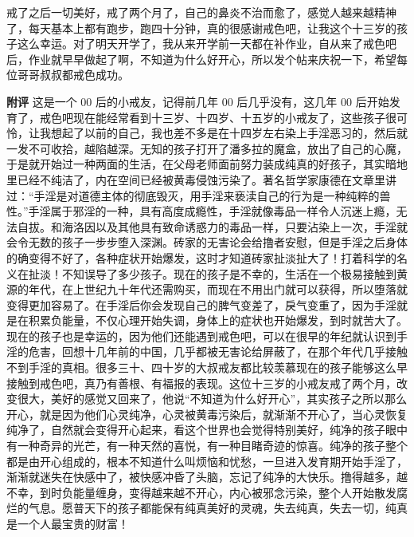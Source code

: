 \begin{case}
    戒了之后一切美好，戒了两个月了，自己的鼻炎不治而愈了，感觉人越来越精神了，每天基本上都有跑步，跑四十分钟，真的很感谢戒色吧，让我这个十三岁的孩子这么幸运。对了明天开学了，我从来开学前一天都在补作业，自从来了戒色吧后，作业就早早做起了啊，不知道为什么好开心，所以发个帖来庆祝一下，希望每位哥哥叔叔都戒色成功。

    \textbf{附评} 这是一个 00 后的小戒友，记得前几年 00 后几乎没有，这几年 00 后开始发育了，戒色吧现在能经常看到十三岁、十四岁、十五岁的小戒友了，这些孩子很可怜，让我想起了以前的自己，我也差不多是在十四岁左右染上手淫恶习的，然后就一发不可收拾，越陷越深。无知的孩子打开了潘多拉的魔盒，放出了自己的心魔，于是就开始过一种两面的生活，在父母老师面前努力装成纯真的好孩子，其实暗地里已经不纯洁了，内在空间已经被黄毒侵蚀污染了。著名哲学家康德在文章里讲过：“手淫是对道德主体的彻底毁灭，用手淫来亵渎自己的行为是一种纯粹的兽性。”手淫属于邪淫的一种，具有高度成瘾性，手淫就像毒品一样令人沉迷上瘾，无法自拔。和海洛因以及其他具有致命诱惑力的毒品一样，只要沾染上一次，手淫就会令无数的孩子一步步堕入深渊。砖家的无害论会给撸者安慰，但是手淫之后身体的确变得不好了，各种症状开始爆发，这时才知道砖家扯淡扯大了！打着科学的名义在扯淡！不知误导了多少孩子。现在的孩子是不幸的，生活在一个极易接触到黄源的年代，在上世纪九十年代还需购买，而现在不用出门就可以获得，所以堕落就变得更加容易了。在手淫后你会发现自己的脾气变差了，戾气变重了，因为手淫就是在积累负能量，不仅心理开始失调，身体上的症状也开始爆发，到时就苦大了。现在的孩子也是幸运的，因为他们还能遇到戒色吧，可以在很早的年纪就认识到手淫的危害，回想十几年前的中国，几乎都被无害论给屏蔽了，在那个年代几乎接触不到手淫的真相。很多三十、四十岁的大叔戒友都比较羡慕现在的孩子能够这么早接触到戒色吧，真乃有善根、有福报的表现。这位十三岁的小戒友戒了两个月，改变很大，美好的感觉又回来了，他说“不知道为什么好开心”，其实孩子之所以那么开心，就是因为他们心灵纯净，心灵被黄毒污染后，就渐渐不开心了，当心灵恢复纯净了，自然就会变得开心起来，看这个世界也会觉得特别美好，纯净的孩子眼中有一种奇异的光芒，有一种天然的喜悦，有一种目睹奇迹的惊喜。纯净的孩子整个都是由开心组成的，根本不知道什么叫烦恼和忧愁，一旦进入发育期开始手淫了，渐渐就迷失在快感中了，被快感冲昏了头脑，忘记了纯净的大快乐。撸得越多，越不幸，到时负能量缠身，变得越来越不开心，内心被邪念污染，整个人开始散发腐烂的气息。愿普天下的孩子都能保有纯真美好的灵魂，失去纯真，失去一切，纯真是一个人最宝贵的财富！
\end{case}

